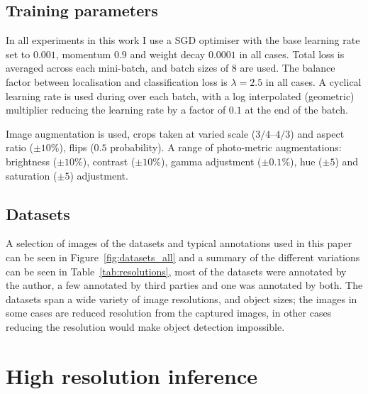 \documentclass[conference]{IEEEtran}
\begin{document}
\subsection{Training parameters}

In all experiments in this work I use a \gls{SGD} optimiser with the base learning rate set to $0.001$, momentum $0.9$ and weight decay $0.0001$ in all cases. Total loss is averaged across each mini-batch, and batch sizes of $8$ are used. The balance factor between localisation and classification loss is $\lambda=2.5$ in all cases. A cyclical learning rate is used during over each batch, with a log interpolated (geometric) multiplier reducing the learning rate by a factor of $0.1$ at the end of the batch. 

Image augmentation is used, crops taken at varied scale (${3/4}$--${4/3}$) and aspect ratio ($\pm 10\%$), flips ($0.5$ probability). A range of photo-metric augmentations: brightness ($\pm 10\%$), contrast ($\pm 10\%$), gamma adjustment ($\pm 0.1\%$), hue ($\pm 5$) and saturation ($\pm 5$) adjustment.


\subsection{Datasets}

A selection of images of the datasets and typical annotations used in this paper can be seen in Figure~\ref{fig:datasets_all} and a summary of the different variations can be seen in Table~\ref{tab:resolutions}, most of the datasets were annotated by the author, a few annotated by third parties and one was annotated by both. The datasets span a wide variety of image resolutions, and object sizes; the images in some cases are reduced resolution from the captured images, in other cases reducing the resolution would make object detection impossible.



\section{High resolution inference}
\end{document}
